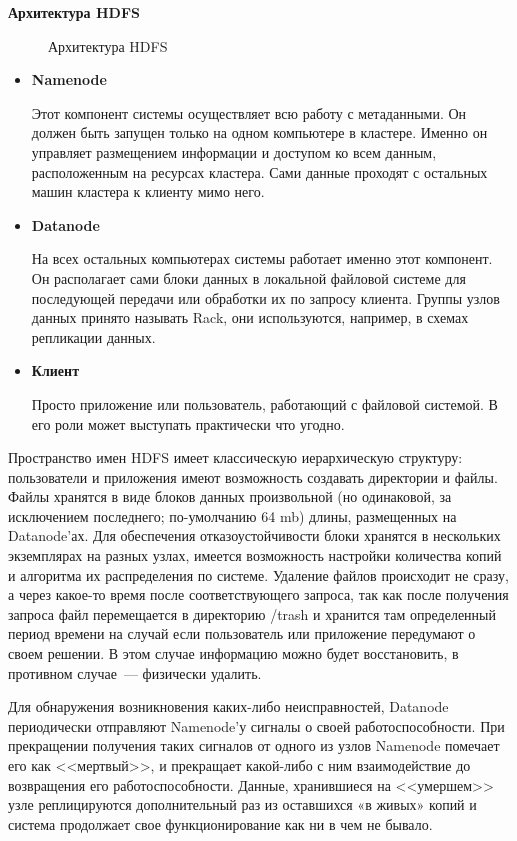 \textbf{Архитектура HDFS}

\begin{figure}[ht!]
\caption{Архитектура HDFS}
\label{ris:hdfsarchitecture}
\end{figure}

\begin{itemize}
\item \textbf{Namenode}

Этот компонент системы осуществляет всю работу с метаданными. Он должен быть запущен только на одном компьютере 
в кластере. Именно он управляет размещением информации и доступом ко всем данным, расположенным на ресурсах кластера. 
Сами данные проходят с остальных машин кластера к клиенту мимо него.

\item \textbf{Datanode}

На всех остальных компьютерах системы работает именно этот компонент. Он располагает сами блоки данных в локальной 
файловой системе для последующей передачи или обработки их по запросу клиента. Группы узлов данных принято называть 
Rack, они используются, например, в схемах репликации данных.

\item \textbf{Клиент}

Просто приложение или пользователь, работающий с файловой системой. В его роли может выступать практически что угодно.
\end{itemize}

Пространство имен HDFS имеет классическую иерархическую структуру: пользователи и приложения имеют возможность 
создавать директории и файлы. Файлы хранятся в виде блоков данных произвольной (но одинаковой, за исключением последнего; 
по-умолчанию 64 mb) длины, размещенных на Datanode'ах. Для обеспечения отказоустойчивости блоки хранятся в нескольких 
экземплярах на разных узлах, имеется возможность настройки количества копий и алгоритма их распределения по системе. 
Удаление файлов происходит не сразу, а через какое-то время после соответствующего запроса, так как после получения 
запроса файл перемещается в директорию /trash и хранится там определенный период времени на случай если пользователь 
или приложение передумают о своем решении. В этом случае информацию можно будет восстановить, в противном случае~--- физически удалить.

Для обнаружения возникновения каких-либо неисправностей, Datanode периодически отправляют Namenode'у сигналы о 
своей работоспособности. При прекращении получения таких сигналов от одного из узлов Namenode помечает его как <<мертвый>>, 
и прекращает какой-либо с ним взаимодействие до возвращения его работоспособности. Данные, хранившиеся на <<умершем>> узле 
реплицируются дополнительный раз из оставшихся «в живых» копий и система продолжает свое функционирование как ни в чем не бывало.

